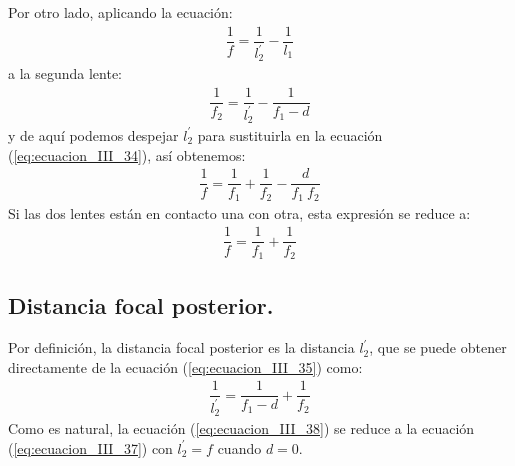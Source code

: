 \documentclass[14pt]{extarticle}
\begin{document}
Por otro lado, aplicando la ecuación:
\begin{align*}
\dfrac{1}{f} = \dfrac{1}{l_{2}^{\prime}} - \dfrac{1}{l_{1}}
\end{align*}
a la segunda lente:
\begin{align}
\dfrac{1}{f_{2}} = \dfrac{1}{l_{2}^{\prime}} - \dfrac{1}{f_{1} - d}
\label{eq:ecuacion_III_35}
\end{align}
y de aquí podemos despejar $l_{2}^{\prime}$ para sustituirla en la ecuación (\ref{eq:ecuacion_III_34}), así obtenemos:
\begin{align}
\dfrac{1}{f} = \dfrac{1}{f_{1}} + \dfrac{1}{f_{2}} - \dfrac{d}{f_{1} \ f_{2}}
\label{eq:ecuacion_III_36}
\end{align}
Si las dos lentes están en contacto una con otra, esta expresión se reduce a:
\begin{align}
\dfrac{1}{f} = \dfrac{1}{f_{1}} + \dfrac{1}{f_{2}}
\label{eq:ecuacion_III_37}
\end{align}

\subsection{Distancia focal posterior.}

Por definición, la distancia focal posterior es la distancia $l_{2}^{\prime}$, que se puede obtener directamente de la ecuación (\ref{eq:ecuacion_III_35}) como:
\begin{align}
\dfrac{1}{l_{2}^{\prime}} = \dfrac{1}{f_{1} - d} + \dfrac{1}{f_{2}}
\label{eq:ecuacion_III_38}
\end{align}
Como es natural, la ecuación (\ref{eq:ecuacion_III_38}) se reduce a la ecuación (\ref{eq:ecuacion_III_37}) con $l_{2}^{\prime} = f$ cuando $d = 0$.
\end{document}
